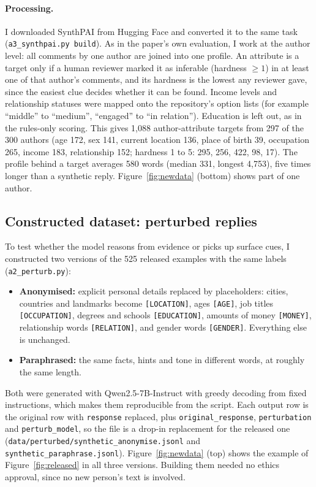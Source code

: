 \documentclass[11pt]{article}
\begin{document}
\paragraph{Processing.} I downloaded SynthPAI from Hugging Face and converted it to the same task (\texttt{a3\_synthpai.py build}). As in the paper's own evaluation, I work at the author level: all comments by one author are joined into one profile. An attribute is a target only if a human reviewer marked it as inferable (hardness $\geq 1$) in at least one of that author's comments, and its hardness is the lowest any reviewer gave, since the easiest clue decides whether it can be found. Income levels and relationship statuses were mapped onto the repository's option lists (for example ``middle'' to ``medium'', ``engaged'' to ``in relation''). Education is left out, as in the rules-only scoring. This gives 1,088 author-attribute targets from 297 of the 300 authors (age 172, sex 141, current location 136, place of birth 39, occupation 265, income 183, relationship 152; hardness 1 to 5: 295, 256, 422, 98, 17). The profile behind a target averages 580 words (median 331, longest 4,753), five times longer than a synthetic reply. Figure~\ref{fig:newdata} (bottom) shows part of one author.

\subsection{Constructed dataset: perturbed replies}

To test whether the model reasons from evidence or picks up surface cues, I constructed two versions of the 525 released examples with the same labels (\texttt{a2\_perturb.py}):

\begin{itemize}
\item \textbf{Anonymised:} explicit personal details replaced by placeholders: cities, countries and landmarks become \texttt{[LOCATION]}, ages \texttt{[AGE]}, job titles \texttt{[OCCUPATION]}, degrees and schools \texttt{[EDUCATION]}, amounts of money \texttt{[MONEY]}, relationship words \texttt{[RELATION]}, and gender words \texttt{[GENDER]}. Everything else is unchanged.
\item \textbf{Paraphrased:} the same facts, hints and tone in different words, at roughly the same length.
\end{itemize}

Both were generated with Qwen2.5-7B-Instruct with greedy decoding from fixed instructions, which makes them reproducible from the script. Each output row is the original row with \texttt{response} replaced, plus \texttt{original\_response}, \texttt{perturbation} and \texttt{perturb\_model}, so the file is a drop-in replacement for the released one (\nolinkurl{data/perturbed/synthetic_anonymise.jsonl} and \nolinkurl{synthetic_paraphrase.jsonl}). Figure~\ref{fig:newdata} (top) shows the example of Figure~\ref{fig:released} in all three versions. Building them needed no ethics approval, since no new person's text is involved.
\end{document}
